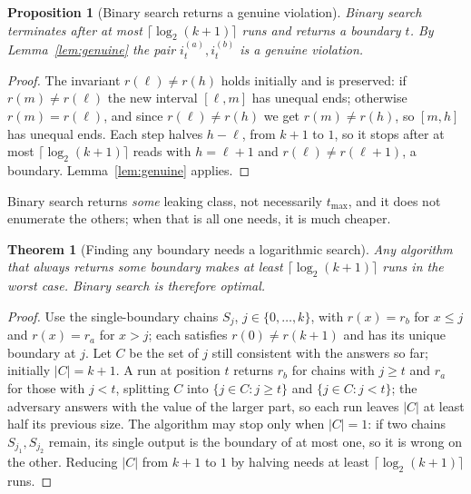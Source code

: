 \documentclass[11pt]{article}
\theoremstyle{definition}
\theoremstyle{plain}
\newtheorem{theorem}{Theorem}
\newtheorem{proposition}{Proposition}
\newcommand{\inp}[2]{i_{#1}^{(#2)}}
\newcommand{\tmax}{t_{\max}}
\begin{document}
\begin{proposition}[Binary search returns a genuine violation]
\label{prop:bsearch}
Binary search terminates after at most $\lceil\log_2(k+1)\rceil$ runs and returns a
boundary $t$. By Lemma~\ref{lem:genuine} the pair $\inp{t}{a},\inp{t}{b}$ is a genuine
violation.
\end{proposition}

\begin{proof}
The invariant $r(\ell)\neq r(h)$ holds initially and is preserved: if $r(m)\neq r(\ell)$
the new interval $[\ell,m]$ has unequal ends; otherwise $r(m)=r(\ell)$, and since
$r(\ell)\neq r(h)$ we get $r(m)\neq r(h)$, so $[m,h]$ has unequal ends. Each step halves
$h-\ell$, from $k+1$ to $1$, so it stops after at most $\lceil\log_2(k+1)\rceil$ reads
with $h=\ell+1$ and $r(\ell)\neq r(\ell+1)$, a boundary. Lemma~\ref{lem:genuine}
applies.
\end{proof}

Binary search returns \emph{some} leaking class, not necessarily $\tmax$, and it does
not enumerate the others; when that is all one needs, it is much cheaper.

\begin{theorem}[Finding any boundary needs a logarithmic search]
\label{thm:lb-bsearch}
Any algorithm that always returns some boundary makes at least $\lceil\log_2(k+1)\rceil$
runs in the worst case. Binary search is therefore optimal.
\end{theorem}

\begin{proof}
Use the single-boundary chains $S_j$, $j\in\{0,\dots,k\}$, with $r(x)=r_b$ for $x\le j$
and $r(x)=r_a$ for $x>j$; each satisfies $r(0)\neq r(k+1)$ and has its unique boundary
at $j$. Let $C$ be the set of $j$ still consistent with the answers so far; initially
$|C|=k+1$. A run at position $t$ returns $r_b$ for chains with $j\ge t$ and $r_a$ for
those with $j<t$, splitting $C$ into $\{j\in C: j\ge t\}$ and $\{j\in C: j<t\}$; the
adversary answers with the value of the larger part, so each run leaves $|C|$ at least
half its previous size. The algorithm may stop only when $|C|=1$: if two chains
$S_{j_1},S_{j_2}$ remain, its single output is the boundary of at most one, so it is
wrong on the other. Reducing $|C|$ from $k+1$ to $1$ by halving needs at least
$\lceil\log_2(k+1)\rceil$ runs.
\end{proof}

\end{document}
